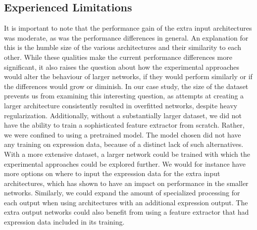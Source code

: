 \subsection{Experienced Limitations}

It is important to note that the performance gain of the extra input architectures was moderate, as was the performance differences in general. An explanation for this is the humble size of the various architectures and their similarity to each other. While these qualities make the current performance differences more significant, it also raises the question about how the experimental approaches would alter the behaviour of larger networks, if they would perform similarly or if the differences would grow or diminish. In our case study, the size of the dataset prevents us from examining this interesting question, as attempts at creating a larger architecture consistently resulted in overfitted networks, despite heavy regularization. Additionally, without a substantially larger dataset, we did not have the ability to train a sophisticated feature extractor from scratch. Rather, we were confined to using a pretrained model. The model chosen did not have any training on expression data, because of a distinct lack of such alternatives. \\

\noindent With a more extensive dataset, a larger network could be trained with which the experimental approaches could be explored further. We would for instance have more options on where to input the expression data for the extra input architectures, which has shown to have an impact on performance in the smaller networks. Similarly, we could expand the amount of specialized processing for each output when using architectures with an additional expression output. The extra output networks could also benefit from using a feature extractor that had expression data included in its training.


\cleardoublepage